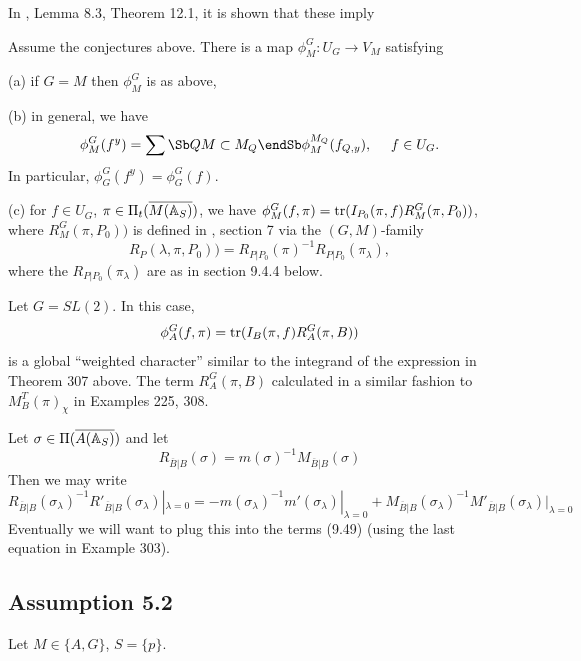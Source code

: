 In \cite{A6}, Lemma 8.3, Theorem 12.1, it is shown that these imply

\begin{theorem} Assume the conjectures above.
There is a map $\phi^G_M :U_G\rightarrow V_M$ satisfying

(a) if $G=M$ then $\phi^G_M$ is as above,

(b) in general, we have
\[
\phi_M^G(f^y)=
\sum\Sb Q \\ M\subset M_Q\endSb
\phi_M^{M_Q}(f_{Q,y}),\ \ \ \ f\in U_G.
\]
In particular, $\phi_G^G(f^y)=\phi_G^G(f)$.

(c) for $f\in U_G$, $\pi\in \Pi_t(\overline{M({\Bbb{A}}_S)})$,
we have $\phi^G_M(f,\pi)={\rm tr}(I_{P_0}(\pi,f)R_M^G(\pi,P_0))$,
where $R_M^G(\pi,P_0))$ is defined in \cite{A6}, section 7
via the $(G,M)$-family
\[
R_P(\lambda, \pi,P_0))=
R_{P|P_0}(\pi)^{-1}R_{P|P_0}(\pi_\lambda),
\]
where the $R_{P|P_0}(\pi_\lambda)$ are as in section 9.4.4 below.
\end{theorem}

\begin{example} Let $G=SL(2)$. In this case,
\[
\phi^G_A(f,\pi)={\rm tr}(I_{B}(\pi,f)R_A^G(\pi,B))
\]
is a global ``weighted character'' similar to the integrand of
the expression in Theorem 307 above. The term $R_A^G(\pi,B)$
calculated in a similar fashion to $M_B^T(\pi)_\chi$
in Examples 225, 308.
\end{example}

Let $\sigma\in \Pi(\overline{A({\Bbb{A}}_S)})$ and let
\[
R_{\overline{B}|B}(\sigma)
=m(\sigma)^{-1}M_{\overline{B}|B}(\sigma)
\]
Then we may write  
\[
R_{\overline{B}|B}(\sigma_\lambda)^{-1}
R'_{\overline{B}|B}(\sigma_\lambda)|_{\lambda =0}
=-m(\sigma_\lambda)^{-1}m'(\sigma_\lambda)|_{\lambda =0}
+M_{\overline{B}|B}(\sigma_\lambda)^{-1}
M'_{\overline{B}|B}(\sigma_\lambda)|_{\lambda =0}
\]
Eventually we will want to plug this into the terms 
(9.49) (using the last equation in Example 303). 

\subsection{Assumption 5.2}

Let $M\in \{A,G\}$, $S=\{p\}$.

